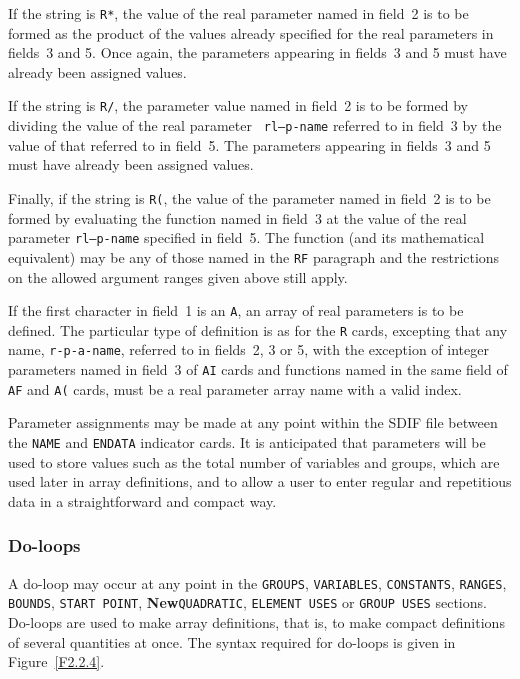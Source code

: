 \documentclass[a4paper]{article}
\begin{document}
If the string is  {\tt  R*},
the value  of the real parameter named in
field~2 is to be formed as the product of the values already specified
for the real parameters in fields~3  and 5. Once again, the parameters
appearing in fields~3 and 5 must have already been assigned values.

If the string is {\tt R/},
the parameter value named  in field~2 is to
be   formed  by dividing  the    value  of  the   real parameter  {\tt
rl--p-name} referred to in field~3  by the value of that  referred
to  in field~5. The parameters appearing  in fields~3 and 5 must  have
already been assigned values.

Finally, if the string is {\tt R(},
the value of the  parameter named
in field~2 is to be formed by evaluating the function named in field~3
at the value of  the real parameter  {\tt  rl--p-name} specified in
field~5. The function (and its mathematical equivalent)  may be any of
those named  in the {\tt  RF} paragraph and  the  restrictions on  the
allowed argument ranges given above still apply.

If the first  character  in field~1 is  an  {\tt A}, an array
of real
parameters is to be defined. The  particular type of definition is as
for the {\tt R} cards,
excepting that any name,  {\tt r-p-a-name},
referred  to  in  fields~2,  3  or  5, with  the  exception of integer
parameters named in field~3 of {\tt  AI} cards and functions  named in
the  same  field   of {\tt AF}  and  {\tt A(}  cards, must   be a real
parameter array name
with a valid index.

Parameter assignments may  be made at any  point  within the SDIF file
between the  {\tt NAME}
and {\tt  ENDATA}
indicator cards.   It is anticipated that  parameters
will be used to store values such as the total number of variables and
groups, which are used later in array
definitions, and to allow a user
to enter regular and repetitious data in a straightforward and compact
way.

\subsubsection{\label{S2.2.4}Do-loops}

A do-loop may occur at any point in the {\tt GROUPS}, {\tt VARIABLES},
{\tt CONSTANTS}, {\tt RANGES},  {\tt BOUNDS},
{\tt START POINT}, {\bf New}{\tt QUADRATIC}, {\tt ELEMENT USES} or
{\tt GROUP USES} sections.
Do-loops are  used to make   array
definitions,  that is,   to  make compact definitions of
several quantities at once. The syntax  required for do-loops is given
in Figure~\ref{F2.2.4}.
\end{document}

